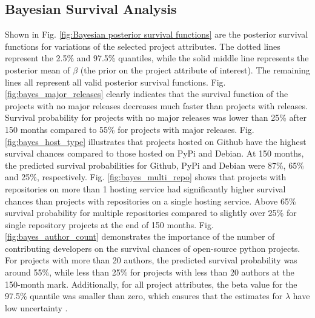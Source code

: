 \documentclass[acmconf]{acmart}
\begin{document}
\subsection{Bayesian Survival Analysis}

Shown in Fig. \ref{fig:Bayesian posterior survival functions} are the posterior survival functions for variations of the selected project attributes. 
The dotted lines represent the  2.5\% and 97.5\% quantiles, while the solid middle line represents the posterior mean of $\beta$ (the prior on the project attribute of interest). 
The remaining lines all represent all valid posterior survival functions. 
Fig. \ref{fig:bayes_major_releases} clearly indicates that the survival function of the projects with no major releases decreases much faster than projects with releases. 
Survival probability for projects with no major releases was lower than 25\% after 150 months compared to 55\% for projects with major releases.
Fig. \ref{fig:bayes_host_type} illustrates that projects hosted on Github have the highest survival chances compared to those hosted on PyPi and Debian. 
At 150 months, the predicted survival probabilities for Github, PyPi and Debian were 87\%, 65\% and 25\%, respectively.
Fig. \ref{fig:bayes_multi_repo} shows that projects with repositories on more than 1 hosting service had significantly higher survival chances than projects with repositories on a single hosting service. 
Above 65\% survival probability for multiple repositories compared to slightly over 25\% for single repository projects at the end of 150 months.
Fig. \ref{fig:bayes_author_count} demonstrates the importance of the number of contributing developers on the survival chances of open-source python projects. 
For projects with more than 20 authors, the predicted survival probability was around 55\%, while less than 25\% for projects with less than 20 authors at the 150-month mark.
Additionally, for all project attributes, the beta value for the 97.5\% quantile was smaller than zero, which ensures that the estimates for $\lambda$ have low uncertainty \cite{kelter2020bayesian}.
\end{document}
